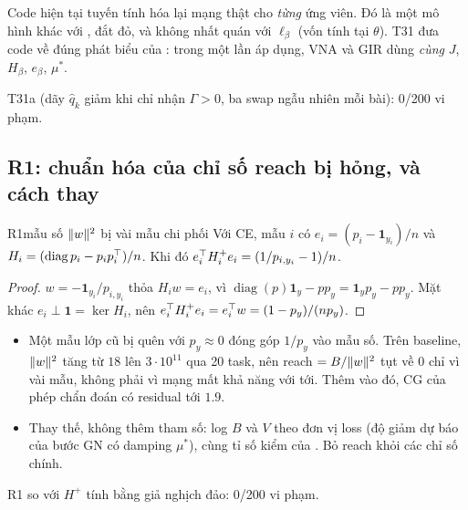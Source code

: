 \begin{hequa}
Code hiện tại tuyến tính hóa lại mạng thật cho \emph{từng} ứng viên. Đó là một mô hình khác với , đắt đỏ, và không nhất quán với $\ell_\beta$ (vốn tính tại $\theta$). T31 đưa code về đúng phát biểu của : trong một lần áp dụng, VNA và GIR dùng \emph{cùng} $J$, $H_\beta$, $e_\beta$, $\mu^*$.
\end{hequa}
\begin{kiem}
T31a (dãy $\hat q_k$ giảm khi chỉ nhận $\Gamma>0$, ba swap ngẫu nhiên mỗi bài): 0/200 vi phạm.
\end{kiem}

\subsection{R1: chuẩn hóa của chỉ số reach bị hỏng, và cách thay}

\begin{namedthm}{R1}{mẫu số $\lVert w\rVert^2$ bị vài mẫu chi phối}
Với CE, mẫu $i$ có $e_i=(p_i-\mathbf 1_{y_i})/n$ và $H_i=(\operatorname{diag}p_i-p_ip_i^{\top})/n$. Khi đó $e_i^{\top} H_i^+e_i=(1/p_{i,y_i}-1)/n$.
\end{namedthm}
\begin{proof}
$w=-\mathbf 1_{y_i}/p_{i,y_i}$ thỏa $H_iw=e_i$, vì $\operatorname{diag}(p)\mathbf 1_y-pp_y=\mathbf 1_yp_y-pp_y$. Mặt khác $e_i\perp\mathbf 1=\ker H_i$, nên $e_i^{\top} H_i^+e_i=e_i^{\top} w=(1-p_y)/(np_y)$.
\end{proof}
\begin{hequa}
\begin{itemize}
\item Một mẫu lớp cũ bị quên với $p_y\approx0$ đóng góp $1/p_y$ vào mẫu số. Trên baseline, $\lVert w\rVert^2$ tăng từ $18$ lên $3\cdot10^{11}$ qua 20 task, nên reach $=B/\lVert w\rVert^2$ tụt về $0$ chỉ vì vài mẫu, không phải vì mạng mất khả năng với tới. Thêm vào đó, CG của phép chẩn đoán có residual tới $1.9$.
\item Thay thế, không thêm tham số: log $B$ và $V$ theo đơn vị loss (độ giảm dự báo của bước GN có damping $\mu^*$), cùng tỉ số kiểm của . Bỏ reach khỏi các chỉ số chính.
\end{itemize}
\end{hequa}
\begin{kiem}
R1 so với $H^+$ tính bằng giả nghịch đảo: 0/200 vi phạm.
\end{kiem}
